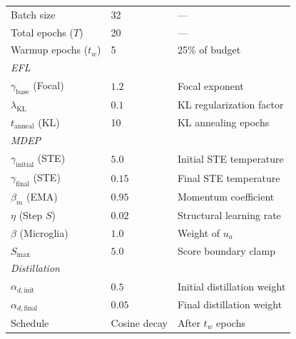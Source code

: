 \documentclass[letterpaper]{article} %
\begin{document}
\begin{table}[H]
\begin{tabular}{@{}lll@{}}
Batch size & 32 & --- \\
Total epochs ($T$) & 20 & --- \\
Warmup epochs ($t_w$) & 5 & 25\% of budget \\
\midrule
\multicolumn{3}{l}{\emph{EFL}} \\
$\gamma_{\text{base}}$ (Focal) & $1.2$ & Focal exponent \\
$\lambda_{\text{KL}}$ & $0.1$ & KL regularization factor \\
$t_{\text{anneal}}$ (KL) & 10 & KL annealing epochs \\
\midrule
\multicolumn{3}{l}{\emph{MDEP}} \\
$\gamma_{\text{initial}}$ (STE) & $5.0$ & Initial STE temperature \\
$\gamma_{\text{final}}$ (STE) & $0.15$ & Final STE temperature \\
$\beta_m$ (EMA) & $0.95$ & Momentum coefficient \\
$\eta$ (Step $S$) & $0.02$ & Structural learning rate \\
$\beta$ (Microglia) & $1.0$ & Weight of $u_a$ \\
$S_{\max}$ & $5.0$ & Score boundary clamp \\
\midrule
\multicolumn{3}{l}{\emph{Distillation}} \\
$\alpha_{d,\text{init}}$ & $0.5$ & Initial distillation weight \\
$\alpha_{d,\text{final}}$ & $0.05$ & Final distillation weight \\
Schedule & Cosine decay & After $t_w$ epochs \\
\bottomrule
\end{tabular}
\end{table}
\end{document}
